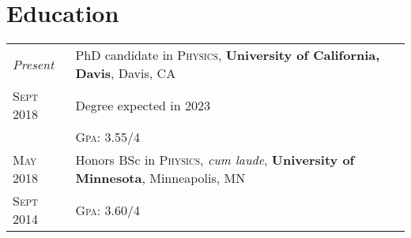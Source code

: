 \documentclass[a4paper,10pt]{article}
\newcommand{\UCD}{\textbf{University of California, Davis\xspace}}
\newcommand{\UMN}{\textbf{University of Minnesota\xspace}}
\begin{document}
\section{Education}
\begin{tabular}{R{1.5cm}|L{14cm}}
\emph{Present}  &  PhD candidate in \textsc{Physics}, \UCD, Davis, CA \\
\textsc{Sept 2018} & Degree expected in 2023 \\
& \textsc{Gpa}: 3.55/4 \\

\hline \hline \hline {}

\textsc{May 2018} & Honors BSc in \textsc{Physics}, \textit{cum laude}, \UMN, Minneapolis, MN \\
\textsc{Sept 2014} 	& \textsc{Gpa}: 3.60/4 \\ 

\end{tabular}


\end{document}
